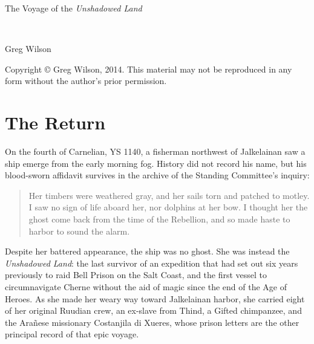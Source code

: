 \documentclass[12pt]{report}
\begin{document}
\newcommand{\UL}{\ship{Unshadowed Land}}
\newcommand{\aemott}{\emph{{\ae}mott}}
\newcommand{\citer}[1]{\emph{#1}}
\newcommand{\ship}[1]{\emph{#1}}
\newcommand{\word}[1]{\emph{#1}}

\begin{titlepage}
  \begin{center}
  \begin{huge}The Voyage of the {\UL}\end{huge}
  \\
  \begin{Large}Greg Wilson\end{Large}

  \vspace*{4cm}

  Copyright {\copyright} Greg Wilson, 2014.  This material may not
  be reproduced in any form without the author's prior permission.

  \end{center}
\end{titlepage}

\newpage

\chapter{The Return}

On the fourth of Carnelian, YS 1140, a fisherman northwest of
Jalkelainan saw a ship emerge from the early morning fog.  History did
not record his name, but his blood-sworn affidavit survives in the
archive of the Standing Committee's inquiry:

\begin{quotation}
Her timbers were weathered gray, and her sails torn and patched to
motley.  I saw no sign of life aboard her, nor dolphins at her
bow.  I thought her the ghost come back from the time of the
Rebellion, and so made haste to harbor to sound the alarm.
\end{quotation}

Despite her battered appearance, the ship was no ghost.  She was
instead the {\UL}: the last survivor of an expedition that had set out
six years previously to raid Bell Prison on the Salt Coast, and the
first vessel to circumnavigate Cherne without the aid of magic since
the end of the Age of Heroes.  As she made her weary way toward
Jalkelainan harbor, she carried eight of her original Ruudian crew, an
ex-slave from Thind, a Gifted chimpanzee, and the Ara\~{n}ese
missionary Costanjila di Xueres, whose prison letters are the other
principal record of that epic voyage.
\end{document}
